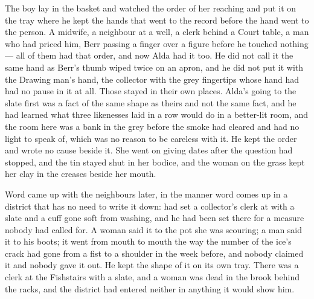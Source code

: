 The boy lay in the basket and watched the order of her reaching and put it on the tray where he kept the hands that went to the record before the hand went to the person. A midwife, a neighbour at a well, a clerk behind a Court table, a man who had priced him, Berr passing a finger over a figure before he touched nothing --- all of them had that order, and now Alda had it too. He did not call it the same hand as Berr's thumb wiped twice on an apron, and he did not put it with the Drawing man's hand, the collector with the grey fingertips whose hand had had no pause in it at all. Those stayed in their own places. Alda's going to the slate first was a fact of the same shape as theirs and not the same fact, and he had learned what three likenesses laid in a row would do in a better-lit room, and the room here was a bank in the grey before the smoke had cleared and had no light to speak of, which was no reason to be careless with it. He kept the order and wrote no cause beside it. She went on giving dates after the question had stopped, and the tin stayed shut in her bodice, and the woman on the grass kept her clay in the creases beside her mouth.

\scenebreak

Word came up with the neighbours later, in the manner word comes up in a district that has no need to write it down:  had set a collector's clerk at  with a slate and a cuff gone soft from washing, and he had been set there for a measure nobody had called for. A woman said it to the pot she was scouring; a man said it to his boots; it went from mouth to mouth the way the number of the ice's crack had gone from a fist to a shoulder in the week before, and nobody claimed it and nobody gave it out. He kept the shape of it on its own tray. There was a clerk at the Fishstairs with a slate, and a woman was dead in the brook behind the racks, and the district had entered neither in anything it would show him.

